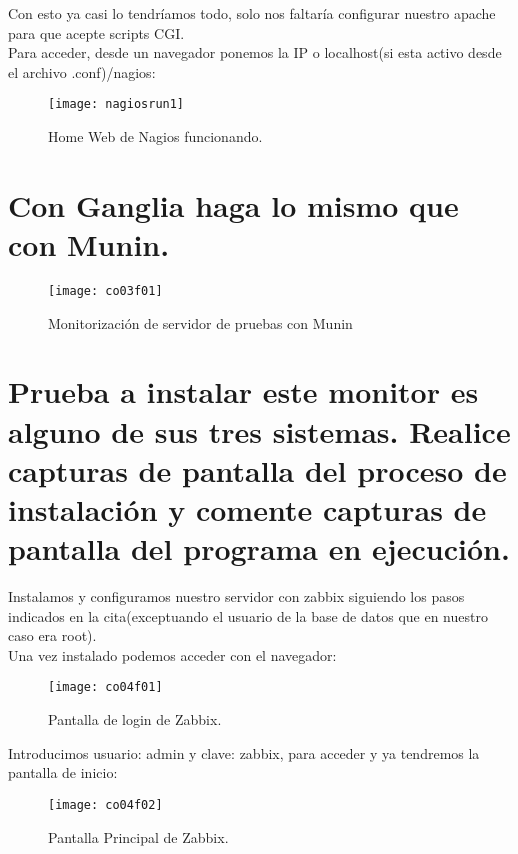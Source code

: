 Con esto ya casi lo tendríamos todo, solo nos faltaría configurar nuestro apache para que acepte scripts CGI.\\

Para acceder, desde un navegador ponemos la IP o localhost(si esta activo desde el archivo .conf)/nagios:

\begin{figure}[H]
	\centering
	\texttt{[image: nagiosrun1]}
	\caption{Home Web de Nagios funcionando.}
	\label{fig:nagiosrun1}
\end{figure}


\section{Con Ganglia haga lo mismo que con Munin.}

\begin{figure}[H]
	\centering
	\texttt{[image: co03f01]}
	\caption{Monitorización de servidor de pruebas con Munin}
	\label{fig:co03f01}
\end{figure}

\section{Prueba a instalar este monitor es alguno de sus tres sistemas. Realice capturas de pantalla del proceso de instalación y comente capturas de pantalla del programa en ejecución.\cite{c04o}}

Instalamos y configuramos nuestro servidor con zabbix siguiendo los pasos indicados en la cita(exceptuando el usuario de la base de datos que en nuestro caso era root).\\
Una vez instalado podemos acceder con el navegador:

\begin{figure}[H]
	\centering
	\texttt{[image: co04f01]}
	\caption{Pantalla de login de Zabbix.}
	\label{fig:co04f01}
\end{figure}

Introducimos usuario: admin y clave: zabbix, para acceder y ya tendremos la pantalla de inicio:\\
\begin{figure}[H]
	\centering
	\texttt{[image: co04f02]}
	\caption{Pantalla Principal de Zabbix.}
	\label{fig:co04f02}
\end{figure}


